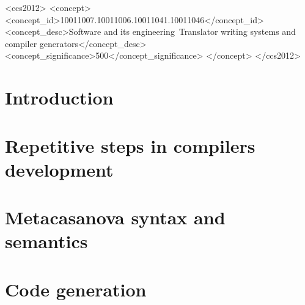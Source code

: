 \documentclass[sigplan,screen]{acmart}%
\begin{document}
\begin{CCSXML}
 \begin{CCSXML}
	<ccs2012>
	<concept>
	<concept_id>10011007.10011006.10011041.10011046</concept_id>
	<concept_desc>Software and its engineering~Translator writing systems and compiler generators</concept_desc>
	<concept_significance>500</concept_significance>
	</concept>
	</ccs2012>
\end{CCSXML}



\maketitle

\section{Introduction}
\label{sec:introduction}


\section{Repetitive steps in compilers development}
\label{sec:problem}


\section{Metacasanova syntax and semantics}
\label{sec:semantics}


\section{Code generation}
\label{sec:code_generation}



\end{CCSXML}
\end{document}
